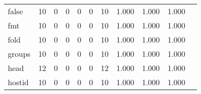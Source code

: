 \begin{longtable}{lp{1.2cm}p{1.2cm}p{1.2cm}p{1.2cm}p{1.2cm}p{1.2cm}p{1.2cm}p{1.2cm}p{1.2cm}p{1.2cm}}
false     &                                    10 &                                                  0 &                                                  0 &                                                  0 &                                                  0 &                                                 10 &                                              1.000 &                                              1.000 &                                              1.000 \\
fmt       &                                    10 &                                                  0 &                                                  0 &                                                  0 &                                                  0 &                                                 10 &                                              1.000 &                                              1.000 &                                              1.000 \\
fold      &                                    10 &                                                  0 &                                                  0 &                                                  0 &                                                  0 &                                                 10 &                                              1.000 &                                              1.000 &                                              1.000 \\
groups    &                                    10 &                                                  0 &                                                  0 &                                                  0 &                                                  0 &                                                 10 &                                              1.000 &                                              1.000 &                                              1.000 \\
head      &                                    12 &                                                  0 &                                                  0 &                                                  0 &                                                  0 &                                                 12 &                                              1.000 &                                              1.000 &                                              1.000 \\
hostid    &                                    10 &                                                  0 &                                                  0 &                                                  0 &                                                  0 &                                                 10 &                                              1.000 &                                              1.000 &                                              1.000 \\

\end{longtable}
